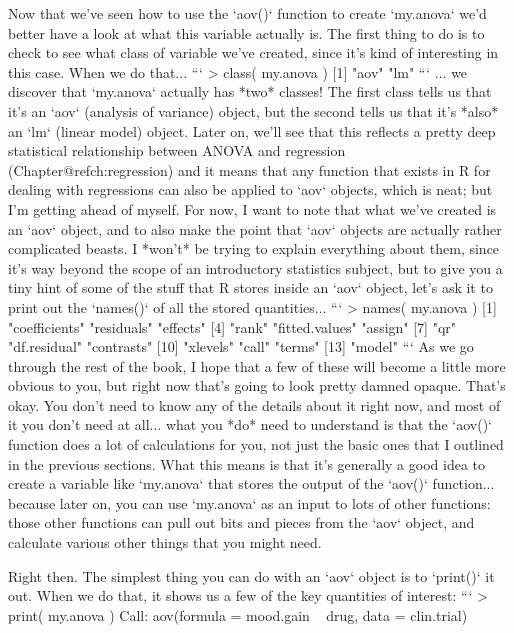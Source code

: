 Now that we've seen how to use the `aov()` function to create `my.anova` we'd better have a look at what this variable actually is. The first thing to do is to check to see what class of variable we've created, since it's  kind of interesting in this case. When we do that...
```
> class( my.anova )
[1] "aov" "lm" 
```
... we discover that `my.anova` actually has *two* classes! The first class tells us that it's an `aov` (analysis of variance) object, but the second tells us that it's *also* an `lm` (linear model) object. Later on, we'll see that this reflects a pretty deep statistical relationship between ANOVA and regression (Chapter@refch:regression) and it means that any function that exists in R for dealing with regressions can also be applied to `aov` objects, which is neat; but I'm getting ahead of myself. For now, I want to note that what we've created is an `aov` object, and to also make the point that `aov` objects are actually rather complicated beasts. I *won't* be trying to explain everything about them, since it's way beyond the scope of an introductory statistics subject, but to give you a tiny hint of some of the stuff that R stores inside an `aov` object, let's ask it to print out the `names()` of all the stored quantities...
```
> names( my.anova )
 [1] "coefficients"  "residuals"     "effects"      
 [4] "rank"          "fitted.values" "assign"       
 [7] "qr"            "df.residual"   "contrasts"    
[10] "xlevels"       "call"          "terms"        
[13] "model"    
```
As we go through the rest of the book, I hope that a few of these will become a little more obvious to you, but right now that's going to look pretty damned opaque. That's okay. You don't need to know any of the details about it right now, and most of it you don't need at all... what you *do* need to understand is that the `aov()` function does a lot of calculations for you, not just the basic ones that I outlined in the previous sections. What this means is that it's generally a good idea to create a variable like `my.anova` that stores the output of the `aov()` function... because later on, you can use `my.anova` as an input to lots of other functions:  those other functions can pull out bits and pieces from the `aov` object, and calculate various other things that you might need.

Right then. The simplest thing you can do with an `aov` object is to `print()` it out. When we do that, it shows us a few of the key quantities of interest:
```
> print( my.anova )
Call:
   aov(formula = mood.gain ~ drug, data = clin.trial)

